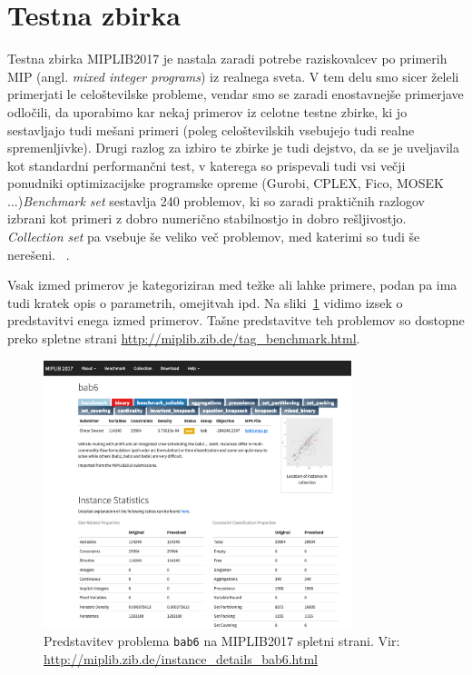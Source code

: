 \documentclass[a4paper,11pt]{article}
\begin{document}
\section{Testna zbirka}
\label{benchmark_data}
Testna zbirka MIPLIB2017 je nastala zaradi potrebe raziskovalcev po primerih MIP (angl. \textit{mixed integer programs}) iz realnega sveta. V tem delu smo sicer želeli primerjati le celoštevilske probleme, vendar smo se zaradi enostavnejše primerjave odločili, da uporabimo kar nekaj primerov iz celotne testne zbirke, ki jo sestavljajo tudi mešani primeri (poleg celoštevilskih vsebujejo tudi realne spremenljivke). Drugi razlog za izbiro te zbirke je tudi dejstvo, da se je uveljavila kot standardni performančni test, v katerega so prispevali tudi vsi večji ponudniki optimizacijske programske opreme (Gurobi, CPLEX, Fico, MOSEK ...)\textit{Benchmark set} sestavlja 240 problemov, ki so zaradi praktičnih razlogov izbrani kot primeri z dobro numerično stabilnostjo in dobro rešljivostjo. \textit{Collection set} pa vsebuje še veliko več problemov, med katerimi so tudi še nerešeni. ~\cite{Miplib:2017}.

Vsak izmed primerov je kategoriziran med težke ali lahke primere, podan pa ima tudi kratek opis o parametrih, omejitvah ipd. Na sliki~\ref{img:miplib_sample_set} vidimo izsek o predstavitvi enega izmed primerov. Tašne predstavitve teh problemov so dostopne preko spletne strani \url{http://miplib.zib.de/tag_benchmark.html}.
\begin{figure}[htpb]
	\centering
	\includegraphics[width=0.8\textwidth]{images/miplib_sample_set.png}
	\caption{Predstavitev problema \texttt{bab6} na MIPLIB2017 spletni strani. \footnotesize Vir: \url{http://miplib.zib.de/instance_details_bab6.html}}
	\label{img:miplib_sample_set}
\end{figure}
\end{document}
